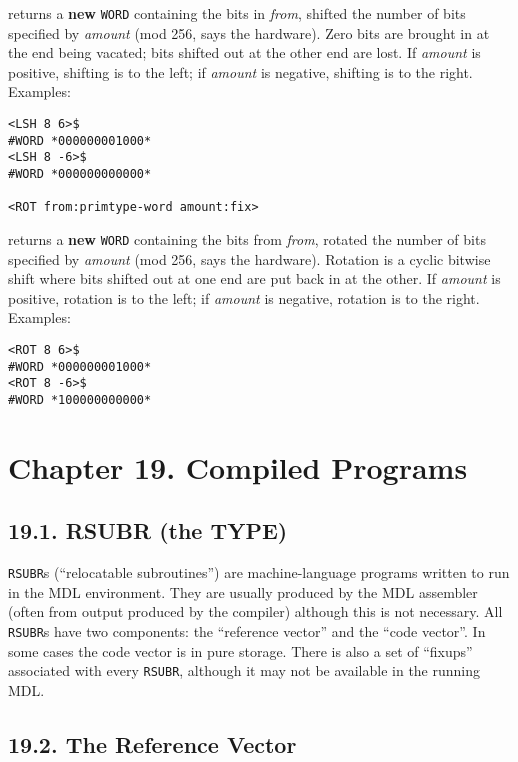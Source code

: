 \documentclass[a4paper,]{article}
\begin{document}
 returns a \textbf{new} \texttt{WORD} containing the bits in \emph{from}, shifted the number of
bits specified by \emph{amount} (mod 256, says the hardware). Zero bits are brought in at the end being vacated; bits
shifted out at the other end are lost. If \emph{amount} is positive, shifting is to the left; if \emph{amount} is negative,
shifting is to the right. Examples:

\begin{verbatim}
<LSH 8 6>$
#WORD *000000001000*
<LSH 8 -6>$
#WORD *000000000000*

<ROT from:primtype-word amount:fix>
\end{verbatim}

 returns a \textbf{new} \texttt{WORD} containing the bits from \emph{from}, rotated the number
of bits specified by \emph{amount} (mod 256, says the hardware). Rotation is a cyclic bitwise shift where bits shifted out
at one end are put back in at the other. If \emph{amount} is positive, rotation is to the left; if \emph{amount} is
negative, rotation is to the right. Examples:

\begin{verbatim}
<ROT 8 6>$
#WORD *000000001000*
<ROT 8 -6>$
#WORD *100000000000*
\end{verbatim}

\section{Chapter 19. Compiled Programs}\label{chapter-19.-compiled-programs}

\subsection{19.1. RSUBR (the TYPE)}\label{rsubr-the-type}

 \texttt{RSUBR}s (``relocatable subroutines'') are machine-language programs written to run in
the MDL environment. They are usually produced by the MDL assembler (often from output produced by the compiler) although
this is not necessary. All \texttt{RSUBR}s have two components: the ``reference vector'' and the ``code vector''. In some
cases the code vector is in pure storage. There is also a set of ``fixups'' associated with every \texttt{RSUBR}, although
it may not be available in the running MDL.

\subsection{19.2. The Reference Vector}\label{the-reference-vector}
\end{document}
